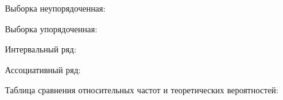 Выборка неупорядоченная:\newline

\newpage
Выборка упорядоченная:\newline

\newpage

Интервальный ряд:\newline
\begin{center}
    
\end{center}

Ассоциативный ряд:\newline
\begin{center}
    
\end{center}
\begin{center}
    
    \newline
    
    \newline
\end{center}

Таблица сравнения относительных частот и теоретических вероятностей:\newline

